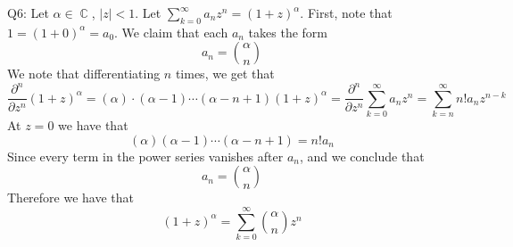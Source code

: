 \documentclass[letterpaper]{article}
\DeclareMathOperator{\C}{\mathbb{C}}
\begin{document}
\noindent
Q6: Let $\alpha \in \C$, $|z|<1$. Let $\sum_{k=0}^\infty a_n z^n = (1+z)^\alpha$. First, note that $1= (1+0)^\alpha = a_0$. We claim that each $a_n$ takes the form $$a_n = {\alpha \choose n }$$
We note that differentiating $n$ times, we get that $$\frac{\partial^n}{\partial z^n} (1+z)^\alpha = (\alpha)\cdot (\alpha-1) \cdots (\alpha-n+1)(1+z)^\alpha = \frac{\partial^n}{\partial z^n} \sum_{k=0}^\infty a_n z^n = \sum_{k=n}^\infty n! a_n z^{n-k}$$
At $z=0$ we have that $$(\alpha)(\alpha-1)\cdots(\alpha-n+1) = n! a_n$$
Since every term in the power series vanishes after $a_n$, and we conclude that $$a_n = {\alpha \choose n}$$
Therefore we have that $$(1+z)^\alpha = \sum_{k=0}^\infty {\alpha \choose n} z^n$$
\end{document}
